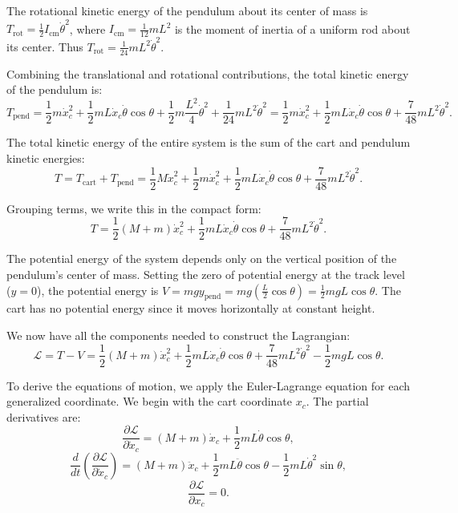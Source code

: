 The rotational kinetic energy of the pendulum about its center of mass is $T_{\text{rot}} = \frac{1}{2}I_{\text{cm}}\dot{\theta}^2$, where $I_{\text{cm}} = \frac{1}{12}mL^2$ is the moment of inertia of a uniform rod about its center. Thus $T_{\text{rot}} = \frac{1}{24}mL^2\dot{\theta}^2$.

Combining the translational and rotational contributions, the total kinetic energy of the pendulum is:
\begin{equation}
T_{\text{pend}} = \frac{1}{2}m\dot{x}_c^2 + \frac{1}{2}mL\dot{x}_c\dot{\theta}\cos\theta + \frac{1}{2}m\frac{L^2}{4}\dot{\theta}^2 + \frac{1}{24}mL^2\dot{\theta}^2 = \frac{1}{2}m\dot{x}_c^2 + \frac{1}{2}mL\dot{x}_c\dot{\theta}\cos\theta + \frac{7}{48}mL^2\dot{\theta}^2.
\end{equation}

The total kinetic energy of the entire system is the sum of the cart and pendulum kinetic energies:
\begin{equation}
T = T_{\text{cart}} + T_{\text{pend}} = \frac{1}{2}M\dot{x}_c^2 + \frac{1}{2}m\dot{x}_c^2 + \frac{1}{2}mL\dot{x}_c\dot{\theta}\cos\theta + \frac{7}{48}mL^2\dot{\theta}^2.
\end{equation}

Grouping terms, we write this in the compact form:
\begin{equation}
T = \frac{1}{2}(M + m)\dot{x}_c^2 + \frac{1}{2}mL\dot{x}_c\dot{\theta}\cos\theta + \frac{7}{48}mL^2\dot{\theta}^2.
\end{equation}

The potential energy of the system depends only on the vertical position of the pendulum's center of mass. Setting the zero of potential energy at the track level ($y = 0$), the potential energy is $V = mgy_{\text{pend}} = mg\left(\frac{L}{2}\cos\theta\right) = \frac{1}{2}mgL\cos\theta$. The cart has no potential energy since it moves horizontally at constant height.

We now have all the components needed to construct the Lagrangian:
\begin{equation}
\mathcal{L} = T - V = \frac{1}{2}(M + m)\dot{x}_c^2 + \frac{1}{2}mL\dot{x}_c\dot{\theta}\cos\theta + \frac{7}{48}mL^2\dot{\theta}^2 - \frac{1}{2}mgL\cos\theta.
\end{equation}

To derive the equations of motion, we apply the Euler-Lagrange equation for each generalized coordinate. We begin with the cart coordinate $x_c$. The partial derivatives are:
\begin{equation}
\frac{\partial \mathcal{L}}{\partial \dot{x}_c} = (M + m)\dot{x}_c + \frac{1}{2}mL\dot{\theta}\cos\theta,
\end{equation}
\begin{equation}
\frac{d}{dt}\left(\frac{\partial \mathcal{L}}{\partial \dot{x}_c}\right) = (M + m)\ddot{x}_c + \frac{1}{2}mL\ddot{\theta}\cos\theta - \frac{1}{2}mL\dot{\theta}^2\sin\theta,
\end{equation}
\begin{equation}
\frac{\partial \mathcal{L}}{\partial x_c} = 0.
\end{equation}

